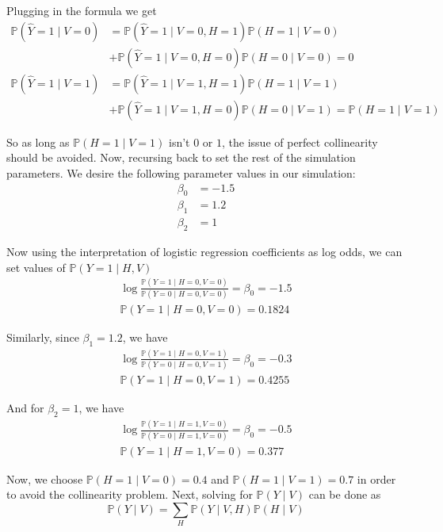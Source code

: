 \documentclass{article}
\begin{document}
Plugging in the formula we get
{\small
\begin{align*}
\mathbb{P}(\hat{Y} = 1\mid V = 0) &= \mathbb{P}(\hat{Y} = 1 \mid V = 0, H = 1)\mathbb{P}(H = 1 \mid V = 0)\\
& + \mathbb{P}(\hat{Y} = 1 \mid V = 0, H = 0)\mathbb{P}(H = 0 \mid V = 0) = 0\\
\mathbb{P}(\hat{Y} = 1\mid V = 1) &= \mathbb{P}(\hat{Y} = 1 \mid V = 1, H = 1)\mathbb{P}(H = 1 \mid V = 1)\\
& + \mathbb{P}(\hat{Y} = 1 \mid V = 1, H = 0)\mathbb{P}(H = 0 \mid V = 1) = \mathbb{P}(H = 1 \mid V = 1)
\end{align*}
}

So as long as $\mathbb{P}(H = 1 \mid V = 1)$ isn't $0$ or $1$, the issue of perfect collinearity should be avoided. Now, recursing back to set the rest of the simulation parameters. We desire the following parameter values in our simulation:
\begin{align*}
\beta_0 &= -1.5\\
\beta_1 &= 1.2\\
\beta_2 &= 1
\end{align*}

Now using the interpretation of logistic regression coefficients as log odds, we can set values of $\mathbb{P}(Y = 1 \mid H, V)$
\begin{align*}
\log{\frac{\mathbb{P}(Y = 1 \mid H =0, V = 0)}{\mathbb{P}(Y = 0 \mid H =0, V = 0)}} = \beta_0 = -1.5\\
\mathbb{P}(Y = 1 \mid H =0, V = 0) = 0.1824
\end{align*}

Similarly, since $\beta_1 = 1.2$, we have 
\begin{align*}
\log{\frac{\mathbb{P}(Y = 1 \mid H =0, V = 1)}{\mathbb{P}(Y = 0 \mid H =0, V = 1)}} = \beta_0 = -0.3\\
\mathbb{P}(Y = 1 \mid H =0, V = 1) = 0.4255
\end{align*}

And for $\beta_2 = 1$, we have 
\begin{align*}
\log{\frac{\mathbb{P}(Y = 1 \mid H =1, V = 0)}{\mathbb{P}(Y = 0 \mid H =1, V = 0)}} = \beta_0 = -0.5\\
\mathbb{P}(Y = 1 \mid H =1, V = 0) = 0.377
\end{align*}

Now, we choose $\mathbb{P}(H = 1 \mid V = 0) = 0.4$ and $\mathbb{P}(H = 1 \mid V = 1) = 0.7$ in order to avoid the collinearity problem. Next, solving for $\mathbb{P}(Y \mid V)$ can be done as
\begin{equation*}
\mathbb{P}(Y \mid V) = \sum_{H} \mathbb{P}(Y \mid V, H)\mathbb{P}(H \mid V)
\end{equation*}
\end{document}

